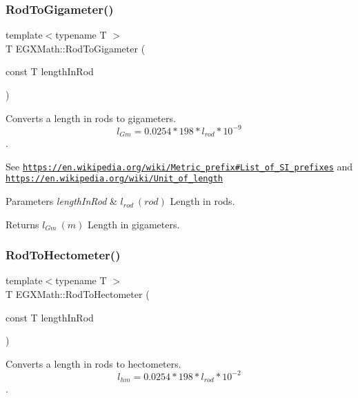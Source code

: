 \subsubsection{\texorpdfstring{Rod\+To\+Gigameter()}{RodToGigameter()}}
{\footnotesize\ttfamily template$<$typename T $>$ \\
T E\+G\+X\+Math\+::\+Rod\+To\+Gigameter (\begin{DoxyParamCaption}\item[{const T}]{length\+In\+Rod }\end{DoxyParamCaption})}



Converts a length in rods to gigameters. \[ l_{Gm}=0.0254 * 198 * l_{rod} * 10^{-9} \]. 

See \href{https://en.wikipedia.org/wiki/Metric_prefix#List_of_SI_prefixes}{\tt https\+://en.\+wikipedia.\+org/wiki/\+Metric\+\_\+prefix\#\+List\+\_\+of\+\_\+\+S\+I\+\_\+prefixes} and \href{https://en.wikipedia.org/wiki/Unit_of_length}{\tt https\+://en.\+wikipedia.\+org/wiki/\+Unit\+\_\+of\+\_\+length} 
\begin{DoxyParams}{Parameters}
{\em length\+In\+Rod} & $ l_{rod}\ (rod)$ Length in rods. \\
\hline
\end{DoxyParams}
\begin{DoxyReturn}{Returns}
$ l_{Gm}\ (m)$ Length in gigameters. 
\end{DoxyReturn}
\mbox{\label{group___e_g_x_math-_conversions-_length_conversions-_imperial-_rod-_s_i_ga9a5cefa380459848ac99b3f9784817ce}} 
\subsubsection{\texorpdfstring{Rod\+To\+Hectometer()}{RodToHectometer()}}
{\footnotesize\ttfamily template$<$typename T $>$ \\
T E\+G\+X\+Math\+::\+Rod\+To\+Hectometer (\begin{DoxyParamCaption}\item[{const T}]{length\+In\+Rod }\end{DoxyParamCaption})}



Converts a length in rods to hectometers. \[ l_{hm}=0.0254 * 198 * l_{rod} * 10^{-2} \]. 

